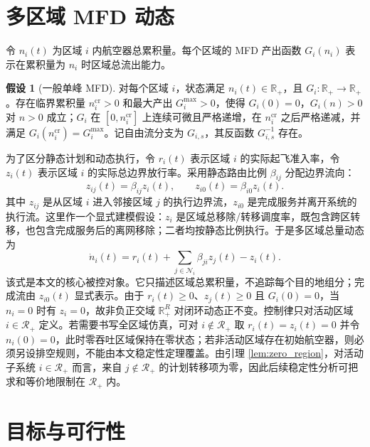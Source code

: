 \documentclass[a4paper,12pt]{article}
\theoremstyle{plain}
\theoremstyle{definition}
\newtheorem{assumption}[theorem]{假设}
\theoremstyle{remark}
\begin{document}
\section{多区域 MFD 动态}

令 $n_i(t)$ 为区域 $i$ 内航空器总累积量。每个区域的 MFD 产出函数 $G_i(n_i)$ 表示在累积量为 $n_i$ 时区域总流出能力。

\begin{assumption}[一般单峰 MFD]\label{asm:mfd}
对每个区域 $i$，状态满足 $n_i(t)\in\mathbb R_+$，且 $G_i:\mathbb R_+\to\mathbb R_+$。存在临界累积量 $n_i^{\mathrm{cr}}>0$ 和最大产出 $G_i^{\max}>0$，使得 $G_i(0)=0$，$G_i(n)>0$ 对 $n>0$ 成立；$G_i$ 在 $[0,n_i^{\mathrm{cr}}]$ 上连续可微且严格递增，在 $n_i^{\mathrm{cr}}$ 之后严格递减，并满足 $G_i(n_i^{\mathrm{cr}})=G_i^{\max}$。记自由流分支为 $G_{i,s}$，其反函数 $G_{i,s}^{-1}$ 存在。
\end{assumption}

为了区分静态计划和动态执行，令 $r_i(t)$ 表示区域 $i$ 的实际起飞准入率，令 $z_i(t)$ 表示区域 $i$ 的实际总边界放行率。采用静态路由比例 $\beta_{ij}$ 分配边界流向：
\begin{equation}\label{eq:boundary_flow}
    z_{ij}(t)=\beta_{ij}z_i(t),
    \qquad
    z_{i0}(t)=\beta_{i0}z_i(t).
\end{equation}
其中 $z_{ij}$ 是从区域 $i$ 进入邻接区域 $j$ 的执行边界流，$z_{i0}$ 是完成服务并离开系统的执行流。这里作一个显式建模假设：$z_i$ 是区域总移除/转移调度率，既包含跨区转移，也包含完成服务后的离网移除；二者均按静态比例执行。于是多区域总量动态为
\begin{equation}\label{eq:dynamics}
    \dot n_i(t)
    =
    r_i(t)
    +
    \sum_{j\in\mathcal N_i}\beta_{ji}z_j(t)
    -
    z_i(t).
\end{equation}
该式是本文的核心被控对象。它只描述区域总累积量，不追踪每个目的地组分；完成流由 $z_{i0}(t)$ 显式表示。由于 $r_i(t)\ge0$、$z_j(t)\ge0$ 且 $G_i(0)=0$，当 $n_i=0$ 时有 $z_i=0$，故非负正交域 $\mathbb R_+^R$ 对闭环动态正不变。控制律只对活动区域 $i\in\mathcal R_+$ 定义。若需要书写全区域仿真，可对 $i\notin\mathcal R_+$ 取 $r_i(t)=z_i(t)=0$ 并令 $n_i(0)=0$，此时零吞吐区域保持在零状态；若非活动区域存在初始航空器，则必须另设排空规则，不能由本文稳定性定理覆盖。由引理 \ref{lem:zero_region}，对活动子系统 $i\in\mathcal R_+$ 而言，来自 $j\notin\mathcal R_+$ 的计划转移项为零，因此后续稳定性分析可把求和等价地限制在 $\mathcal R_+$ 内。

\section{目标与可行性}
\end{document}
